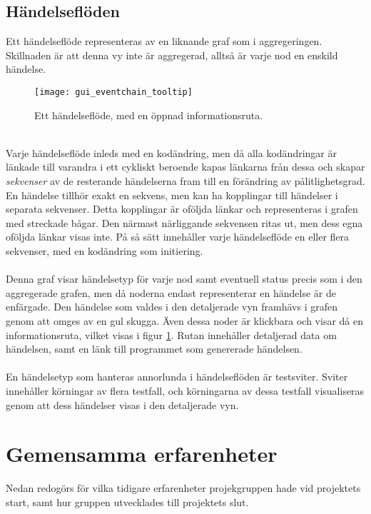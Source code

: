 \subsection{Händelseflöden}
Ett händelseflöde representeras av en liknande graf som i aggregeringen. Skillnaden är att denna vy inte är aggregerad, alltså är varje nod en enskild händelse. 
\begin{figure}[H]
  \centering
  \texttt{[image: gui\_eventchain\_tooltip]}
  \caption{Ett händelseflöde, med en öppnad informationsruta.}
  \label{fig:gui_eventchain_tooltip}
\end{figure}
\ \\
Varje händelseflöde inleds med en kodändring, men då alla kodändringar är länkade till varandra i ett cykliskt beroende kapas länkarna från dessa och skapar \textit{sekvenser} av de resterande händelserna fram till en förändring av pålitlighetsgrad.
En händelse tillhör exakt en sekvens, men kan ha kopplingar till händelser i separata sekvenser. Detta kopplingar är oföljda länkar och representeras i grafen med streckade bågar. Den närmast närliggande sekvensen ritas ut, men dess egna oföljda länkar visas inte. På så sätt innehåller varje händelseflöde en eller flera sekvenser, med en kodändring som initiering.
\\ \\
Denna graf visar händelsetyp för varje nod samt eventuell status precis som i den aggregerade grafen, men då noderna endast representerar en händelse är de enfärgade. Den händelse som valdes i den detaljerade vyn framhävs i grafen genom att omges av en gul skugga. Även dessa noder är klickbara och visar då en informationsruta, vilket visas i figur \ref{fig:gui_eventchain_tooltip}. Rutan innehåller detaljerad data om händelsen, samt en länk till programmet som genererade händelsen. %
\\ \\
En händelsetyp som hanteras annorlunda i händelseflöden är testsviter. Sviter innehåller körningar av flera testfall, och körningarna av dessa testfall visualiseras genom att dess händelser visas i den detaljerade vyn.

\section{Gemensamma erfarenheter}
\label{sec:results-experiences}
Nedan redogörs för vilka tidigare erfarenheter projekgruppen hade vid projektets start, samt hur gruppen utvecklades till projektets slut.

